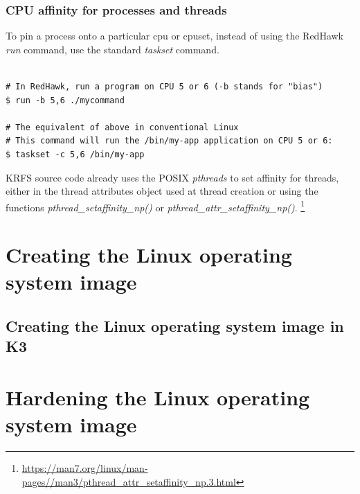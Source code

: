 \documentclass[12pt]{article}
\begin{document}
\subsubsection{CPU affinity for processes and threads}

To pin a process onto a particular cpu or cpuset, instead of using the RedHawk
\emph{run} command, use the standard \emph{taskset} command.

\lstset{
    language=bash,
    basicstyle=\footnotesize\ttfamily,
    linewidth=7in,
    showstringspaces=false,
    keywordstyle=\ttfamily
}
\begin{adjustwidth}{0.0in}{0.0in}
\begin{lstlisting}[caption={Use taskset instead of run},
label={lst:taskset_cmd}]

# In RedHawk, run a program on CPU 5 or 6 (-b stands for "bias")
$ run -b 5,6 ./mycommand

# The equivalent of above in conventional Linux
# This command will run the /bin/my-app application on CPU 5 or 6:
$ taskset -c 5,6 /bin/my-app

\end{lstlisting}
\end{adjustwidth}

KRFS source code already uses the POSIX \emph{pthreads} to set affinity for
threads, either in the thread attributes object used at thread creation or using
the functions \emph{pthread\_setaffinity\_np()} or
\emph{pthread\_attr\_setaffinity\_np()}.%
\footnote{\url{https://man7.org/linux/man-pages//man3/pthread_attr_setaffinity_np.3.html}}


%
\newpage
\section{Creating the Linux operating system image}
\label{sec:image_creation}

\subsection{Creating the Linux operating system image in K3}


%
\newpage
\section{Hardening the Linux operating system image}
\label{sec:image_hardening}
\end{document}
